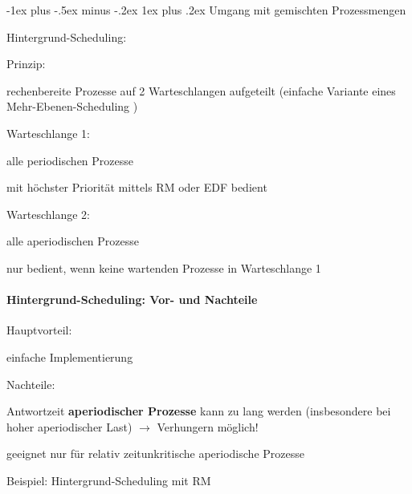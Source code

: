 \documentclass[a4paper]{article}
\makeatletter
\renewcommand{\subsubsection}{\@startsection{subsubsection}{3}{0mm}%
 {-1ex plus -.5ex minus -.2ex}%
 {1ex plus .2ex}%
 {\normalfont\small\bfseries}}
\makeatother
\begin{document}
\begin{multicols}{3}
    \subsubsection{Umgang mit gemischten
        Prozessmengen}

    \begin{itemize*}
        \item
        Hintergrund-Scheduling:
        \begin{itemize*}
            \item Prinzip: %
            \item rechenbereite Prozesse auf 2 Warteschlangen aufgeteilt (einfache Variante eines Mehr-Ebenen-Scheduling )
            \item Warteschlange 1: \begin{itemize*} \item alle periodischen Prozesse \item mit höchster Priorität mittels RM oder EDF bedient \end{itemize*}
            \item Warteschlange 2: \begin{itemize*} \item alle aperiodischen Prozesse \item nur bedient, wenn keine wartenden Prozesse in Warteschlange 1 \end{itemize*}
        \end{itemize*}
    \end{itemize*}


    \paragraph{Hintergrund-Scheduling: Vor- und
        Nachteile}

    \begin{itemize*}
        \item
        Hauptvorteil:
        \begin{itemize*}
            \item einfache Implementierung
        \end{itemize*}
        \item
        Nachteile:
        \begin{itemize*}
            \item Antwortzeit \textbf{aperiodischer Prozesse} kann zu lang werden (insbesondere bei hoher aperiodischer Last) $\rightarrow$ Verhungern möglich!
            \item geeignet nur für relativ zeitunkritische aperiodische Prozesse
        \end{itemize*}
        \item
        Beispiel: Hintergrund-Scheduling mit RM
    \end{itemize*}



\end{multicols}
\end{document}
